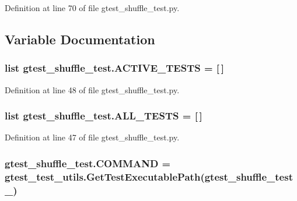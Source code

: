 Definition at line 70 of file gtest\+\_\+shuffle\+\_\+test.\+py.



\subsection{Variable Documentation}
\subsubsection[{\texorpdfstring{A\+C\+T\+I\+V\+E\+\_\+\+T\+E\+S\+TS}{ACTIVE_TESTS}}]{\setlength{\rightskip}{0pt plus 5cm}list gtest\+\_\+shuffle\+\_\+test.\+A\+C\+T\+I\+V\+E\+\_\+\+T\+E\+S\+TS = \mbox{[}$\,$\mbox{]}}\hypertarget{namespacegtest__shuffle__test_acd6d827819dcc06b9bf061cd4849b082}{}\label{namespacegtest__shuffle__test_acd6d827819dcc06b9bf061cd4849b082}


Definition at line 48 of file gtest\+\_\+shuffle\+\_\+test.\+py.

\subsubsection[{\texorpdfstring{A\+L\+L\+\_\+\+T\+E\+S\+TS}{ALL_TESTS}}]{\setlength{\rightskip}{0pt plus 5cm}list gtest\+\_\+shuffle\+\_\+test.\+A\+L\+L\+\_\+\+T\+E\+S\+TS = \mbox{[}$\,$\mbox{]}}\hypertarget{namespacegtest__shuffle__test_aede96442ff7a7c9ac9a8baaaeb48e86c}{}\label{namespacegtest__shuffle__test_aede96442ff7a7c9ac9a8baaaeb48e86c}


Definition at line 47 of file gtest\+\_\+shuffle\+\_\+test.\+py.

\subsubsection[{\texorpdfstring{C\+O\+M\+M\+A\+ND}{COMMAND}}]{\setlength{\rightskip}{0pt plus 5cm}gtest\+\_\+shuffle\+\_\+test.\+C\+O\+M\+M\+A\+ND = {\bf gtest\+\_\+test\+\_\+utils.\+Get\+Test\+Executable\+Path}(\textquotesingle{}gtest\+\_\+shuffle\+\_\+test\+\_\+\textquotesingle{})}\hypertarget{namespacegtest__shuffle__test_a33b8a2fc24ccd6476d1e27b084142a25}{}\label{namespacegtest__shuffle__test_a33b8a2fc24ccd6476d1e27b084142a25}


